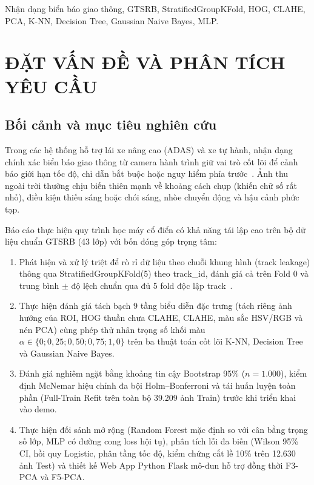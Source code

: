 \documentclass[conference]{IEEEtran}
\begin{document}
\begin{IEEEkeywords}
Nhận dạng biển báo giao thông, GTSRB, StratifiedGroupKFold, HOG, CLAHE, PCA, K-NN, Decision Tree, Gaussian Naive Bayes, MLP.
\end{IEEEkeywords}

\section{ĐẶT VẤN ĐỀ VÀ PHÂN TÍCH YÊU CẦU}

\subsection{Bối cảnh và mục tiêu nghiên cứu}
Trong các hệ thống hỗ trợ lái xe nâng cao (ADAS) và xe tự hành, nhận dạng chính xác biển báo giao thông từ camera hành trình giữ vai trò cốt lõi để cảnh báo giới hạn tốc độ, chỉ dẫn bắt buộc hoặc nguy hiểm phía trước~\cite{stallkamp2012man}. Ảnh thu ngoài trời thường chịu biến thiên mạnh về khoảng cách chụp (khiến chữ số rất nhỏ), điều kiện thiếu sáng hoặc chói sáng, nhòe chuyển động và hậu cảnh phức tạp.

Báo cáo thực hiện quy trình học máy cổ điển có khả năng tái lập cao trên bộ dữ liệu chuẩn GTSRB (43 lớp) với bốn đóng góp trọng tâm:
\begin{enumerate}
  \item Phát hiện và xử lý triệt để rò rỉ dữ liệu theo chuỗi khung hình (track leakage) thông qua StratifiedGroupKFold(5) theo track\_id, đánh giá cả trên Fold 0 và trung bình $\pm$ độ lệch chuẩn qua đủ 5 fold độc lập track~\cite{kaufman2012leakage,pedregosa2011scikit}.
  \item Thực hiện đánh giá tách bạch 9 tầng biểu diễn đặc trưng (tách riêng ảnh hưởng của ROI, HOG thuần chưa CLAHE, CLAHE, màu sắc HSV/RGB và nén PCA) cùng phép thử nhân trọng số khối màu $\alpha \in \{0; 0{,}25; 0{,}50; 0{,}75; 1{,}0\}$ trên ba thuật toán cốt lõi K-NN, Decision Tree và Gaussian Naive Bayes.
  \item Đánh giá nghiêm ngặt bằng khoảng tin cậy Bootstrap 95\% ($n=1.000$), kiểm định McNemar hiệu chỉnh đa bội Holm--Bonferroni và tái huấn luyện toàn phần (Full-Train Refit trên toàn bộ 39.209 ảnh Train) trước khi triển khai vào demo.
  \item Thực hiện đối sánh mở rộng (Random Forest mặc định so với cân bằng trọng số lớp, MLP có đường cong loss hội tụ), phân tích lỗi đa biến (Wilson 95\% CI, hồi quy Logistic, phân tầng tốc độ, kiểm chứng cắt lề 10\% trên 12.630 ảnh Test) và thiết kế Web App Python Flask mô-đun hỗ trợ đồng thời F3-PCA và F5-PCA.
\end{enumerate}
\end{document}

